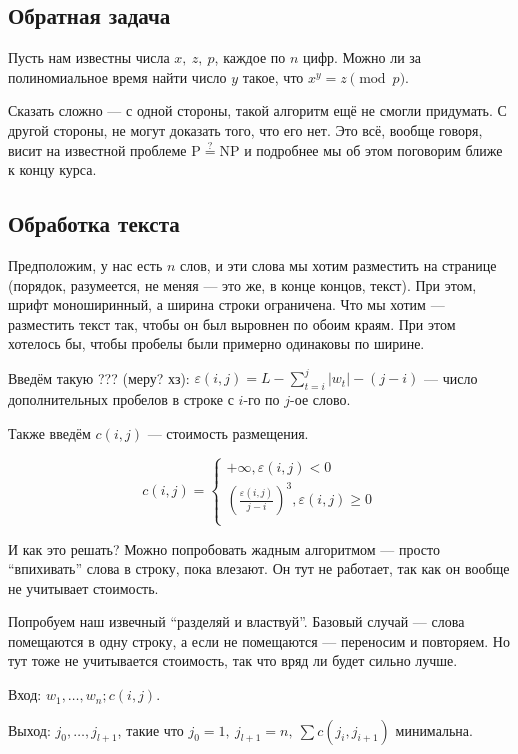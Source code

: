\documentclass[a4paper,12pt]{article}
\begin{document}
\subsection{Обратная задача}

Пусть нам известны числа $x,\ z,\ p$, каждое по $n$ цифр. Можно ли за полиномиальное время найти число $y$ такое, что $x^y = z \pmod{p}$.

Сказать сложно --- с одной стороны, такой алгоритм ещё не смогли придумать. С другой стороны, не могут доказать того, что его нет. Это всё, вообще говоря, висит на известной проблеме $\mathrm{P} \mathrel{\overset{?}{=}} \mathrm{NP}$ и подробнее мы об этом поговорим ближе к концу курса.

\subsection{Обработка текста}
Предположим, у нас есть $n$ слов, и эти слова мы хотим разместить на странице (порядок, разумеется, не меняя --- это же, в конце концов, текст). При этом, шрифт моноширинный, а ширина строки ограничена. Что мы хотим --- разместить текст так, чтобы он был выровнен по обоим краям. При этом хотелось бы, чтобы пробелы были примерно одинаковы по ширине.

Введём такую ??? (меру? хз): $\varepsilon(i, j) = L-\sum\limits_{t=i}^j|w_t|-(j-i)$ --- число дополнительных пробелов в строке с $i$-го по $j$-ое слово.

Также введём $c(i, j)$ --- стоимость размещения.

\[
    c(i, j) = \begin{cases}
        +\infty, \varepsilon(i, j) < 0\\
        \left( \frac{\varepsilon(i, j)}{j-i} \right)^3, \varepsilon(i, j) \geqslant 0\\
    \end{cases}
\]

И как это решать? Можно попробовать жадным алгоритмом --- просто ``впихивать'' слова в строку, пока влезают. Он тут не работает, так как он вообще не учитывает стоимость.

Попробуем наш извечный ``разделяй и властвуй''. Базовый случай --- слова помещаются в одну строку, а если не помещаются --- переносим и повторяем. Но тут тоже не учитывается стоимость, так что вряд ли будет сильно лучше.

Вход: $w_1, \ldots, w_n; c(i, j)$.

Выход: $j_0, \ldots, j_{l+1}$, такие что $j_0 = 1,\ j_{l+1} = n,\ \sum c(j_i, j_{i+1})$ минимальна.
\end{document}

